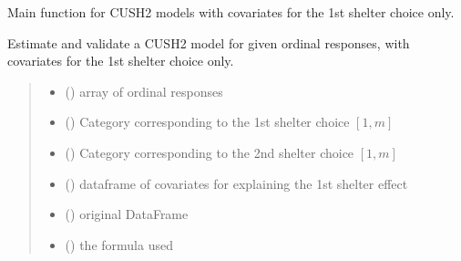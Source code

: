 \documentclass[letterpaper,10pt,english]{sphinxmanual}
\begin{document}
\begin{fulllineitems}
\label{\detokenize{cubmods:cubmods.cush2_x0.mle}}
\pysigstartsignatures
{}
\pysigstopsignatures
\sphinxAtStartPar
Main function for CUSH2 models with covariates for the 1st shelter choice only.

\sphinxAtStartPar
Estimate and validate a CUSH2 model for given ordinal responses, with covariates for the 1st shelter choice only.
\begin{quote}\begin{description}
\begin{itemize}
\item {} 
\sphinxAtStartPar
{} () \textendash{} array of ordinal responses

\item {} 
\sphinxAtStartPar
{} () \textendash{} Category corresponding to the 1st shelter choice \([1,m]\)

\item {} 
\sphinxAtStartPar
{} () \textendash{} Category corresponding to the 2nd shelter choice \([1,m]\)

\item {} 
\sphinxAtStartPar
{} () \textendash{} dataframe of covariates for explaining the 1st shelter effect

\item {} 
\sphinxAtStartPar
{} () \textendash{} original DataFrame

\item {} 
\sphinxAtStartPar
{} () \textendash{} the formula used


\end{itemize}
\end{description}
\end{quote}
\end{fulllineitems}
\end{document}
